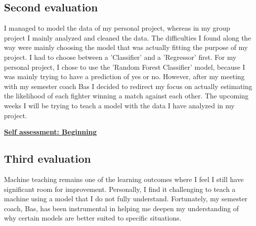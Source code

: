 \documentclass{article}
\begin{document}
	\subsection{Second evaluation}
	I managed to model the data of my personal project, whereas in my group project I mainly analyzed and cleaned the data. The difficulties
	I found along the way were mainly choosing the model that was actually fitting the purpose of my project. I had to choose between a 'Classifier'
	and a 'Regressor' first. For my personal project, I chose to use the 'Random Forest Classifier' model, because I was mainly trying to have a 
	prediction of yes or no. However, after my meeting with my semester coach Bas I decided to redirect my focus on actually estimating 
	the likelihood of each fighter winning a match against each other. The upcoming weeks I will be trying to teach a model with the data I have
  analyzed in my project.
	
  \underline{\textbf{Self assessment: Beginning}}
	
	\subsection{Third evaluation}
	Machine teaching remains one of the learning outcomes where I feel I still have significant room for improvement. Personally, I find it challenging to teach a machine using a model that I do not fully understand. Fortunately, my semester coach, Bas, has been instrumental in helping me deepen my understanding of why certain models are better suited to specific situations.\\
	
\end{document}
